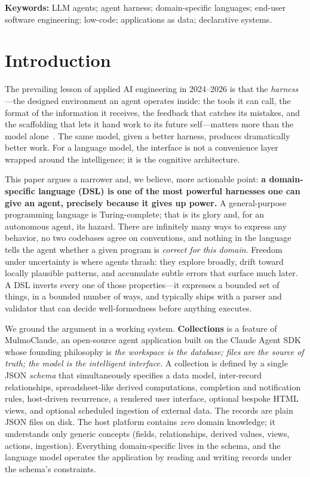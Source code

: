 \documentclass[11pt]{article}
\begin{document}
\noindent\textbf{Keywords:} LLM agents; agent harness; domain-specific languages;
end-user software engineering; low-code; applications as data; declarative systems.

\section{Introduction}
\label{sec:intro}

The prevailing lesson of applied AI engineering in 2024--2026 is that the
\emph{harness}---the designed environment an agent operates inside: the tools it
can call, the format of the information it receives, the feedback that catches its
mistakes, and the scaffolding that lets it hand work to its future self---matters
more than the model alone~\citep{yang2024sweagent,yao2023react}. The same model,
given a better harness, produces dramatically better work. For a language model,
the interface is not a convenience layer wrapped around the intelligence; it is
the cognitive architecture.

This paper argues a narrower and, we believe, more actionable point: \textbf{a
domain-specific language (DSL) is one of the most powerful harnesses one can give
an agent, precisely because it gives up power.} A general-purpose programming
language is Turing-complete; that is its glory and, for an autonomous agent, its
hazard. There are infinitely many ways to express any behavior, no two codebases
agree on conventions, and nothing in the language tells the agent whether a given
program is \emph{correct for this domain}. Freedom under uncertainty is where
agents thrash: they explore broadly, drift toward locally plausible patterns, and
accumulate subtle errors that surface much later. A DSL inverts every one of those
properties---it expresses a bounded set of things, in a bounded number of ways,
and typically ships with a parser and validator that can decide well-formedness
before anything executes.

We ground the argument in a working system. \textbf{Collections} is a feature of
MulmoClaude, an open-source agent application built on the Claude Agent SDK whose
founding philosophy is \emph{the workspace is the database; files are the source
of truth; the model is the intelligent interface.} A collection is defined by a
single JSON \emph{schema} that simultaneously specifies a data model, inter-record
relationships, spreadsheet-like derived computations, completion and notification
rules, host-driven recurrence, a rendered user interface, optional bespoke HTML
views, and optional scheduled ingestion of external data. The records are plain
JSON files on disk. The host platform contains \emph{zero} domain knowledge; it
understands only generic concepts (fields, relationships, derived values, views,
actions, ingestion). Everything domain-specific lives in the schema, and the
language model operates the application by reading and writing records under the
schema's constraints.
\end{document}
